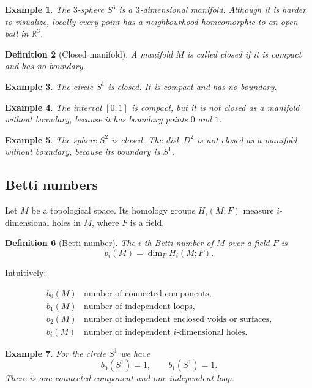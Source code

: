 \documentclass[12pt,a4paper]{article}
\theoremstyle{notespace}
\newtheorem{definition}{Definition}[section]
\newtheorem{example}[definition]{Example}
\begin{document}
\begin{example}
	The $3$-sphere $S^3$ is a $3$-dimensional manifold. Although it is harder to
	visualize, locally every point has a neighbourhood homeomorphic to an open ball
	in $\mathbb{R}^3$.
\end{example}

\begin{definition}[Closed manifold]
	A manifold $M$ is called \emph{closed} if it is compact and has no boundary.
\end{definition}

\begin{example}
	The circle $S^1$ is closed. It is compact and has no boundary.
\end{example}

\begin{example}
	The interval $[0,1]$ is compact, but it is not closed as a manifold without
	boundary, because it has boundary points $0$ and $1$.
\end{example}

\begin{example}
	The sphere $S^2$ is closed. The disk $D^2$ is not closed as a manifold without
	boundary, because its boundary is $S^1$.
\end{example}

\subsection{Betti numbers}

Let $M$ be a topological space. Its homology groups $H_i(M;F)$ measure
$i$-dimensional holes in $M$, where $F$ is a field.

\begin{definition}[Betti number]
	The $i$-th Betti number of $M$ over a field $F$ is
	\[
	b_i(M) = \dim_F H_i(M;F).
	\]
\end{definition}

Intuitively:

\[
\begin{array}{c|l}
	b_0(M) & \text{number of connected components},\\
	b_1(M) & \text{number of independent loops},\\
	b_2(M) & \text{number of independent enclosed voids or surfaces},\\
	b_i(M) & \text{number of independent $i$-dimensional holes}.
\end{array}
\]

\begin{example}
	For the circle $S^1$ we have
	\[
	b_0(S^1)=1, \qquad b_1(S^1)=1.
	\]
	There is one connected component and one independent loop.
\end{example}
\end{document}

